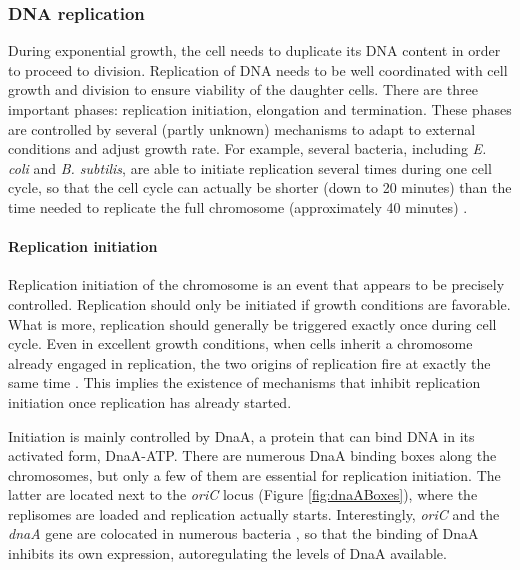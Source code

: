 \subsubsection{DNA replication}

During exponential growth, the cell needs to duplicate its DNA content in order to proceed to division. Replication of DNA needs to be well coordinated with cell growth and division to ensure viability of the daughter cells. There are three important phases: replication initiation, elongation and termination. These phases are controlled by several (partly unknown) mechanisms to adapt to external conditions and adjust growth rate. For example, several bacteria, including \textit{E. coli} and \textit{B. subtilis}, are able to initiate replication several times during one cell cycle, so that the cell cycle can actually be shorter (down to 20 minutes) than the time needed to replicate the full chromosome (approximately 40 minutes) \citep{reyes-lamothe_chromosome_2012}.

\paragraph{Replication initiation} Replication initiation of the chromosome is an event that appears to be precisely controlled. Replication should only be initiated if growth conditions are favorable. What is more, replication should generally be triggered exactly once during cell cycle. Even in excellent growth conditions, when cells inherit a chromosome already engaged in replication, the two origins of replication fire at exactly the same time \citep{kaur_building_2014}. This implies the existence of mechanisms that inhibit replication initiation once replication has already started.

Initiation is mainly controlled by DnaA, a protein that can bind DNA in its activated form, DnaA-ATP. There are numerous DnaA binding boxes along the chromosomes, but only a few of them are essential for replication initiation. The latter are located next to the \textit{oriC} locus (Figure \ref{fig:dnaABoxes}), where the replisomes are loaded and replication actually starts. Interestingly, \textit{oriC} and the \textit{dnaA} gene are colocated in numerous bacteria \citep{briggs_chromosomal_2012}, so that the binding of DnaA inhibits its own expression, autoregulating the levels of DnaA available.

